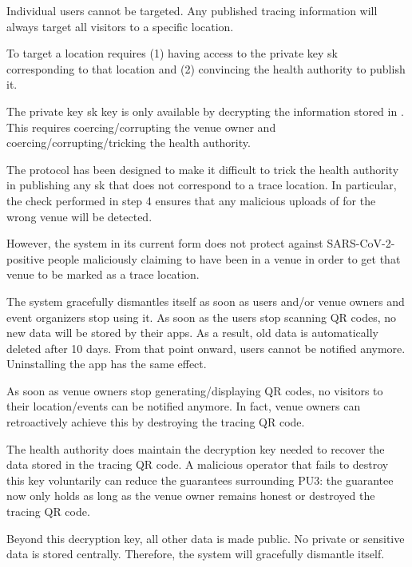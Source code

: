  Individual users cannot be targeted. Any published tracing information will always target all visitors to a specific location.

 To target a location requires (1) having access to the private key sk corresponding to that location and (2) convincing the health authority to publish it.

The private key sk key is only available by decrypting the information stored in \qrtrace. This requires coercing/corrupting the venue owner and coercing/corrupting/tricking the health authority.

The protocol has been designed to make it difficult to trick the health authority in publishing any sk that does not correspond to a trace location. In particular, the check performed in step 4 ensures that any malicious uploads of \qrtrace for the wrong venue will be detected.

However, the system in its current form does not protect against SARS-CoV-2-positive people maliciously claiming to have been in a venue in order to get that venue to be marked as a trace location.

 The system gracefully dismantles itself as soon as users and/or venue owners and event organizers stop using it. As soon as the users stop scanning QR codes, no new data will be stored by their apps. As a result, old data is automatically deleted after 10 days. From that point onward, users cannot be notified anymore. Uninstalling the app has the same effect.

As soon as venue owners stop generating/displaying QR codes, no visitors to their location/events can be notified anymore. In fact, venue owners can retroactively achieve this by destroying the tracing QR code.

The health authority does maintain the decryption key needed to recover the data stored in the tracing QR code. A malicious operator that fails to destroy this key voluntarily can reduce the guarantees surrounding PU3: the guarantee now only holds as long as the venue owner remains honest or destroyed the tracing QR code. 

Beyond this decryption key, all other data is made public. No private or sensitive data is stored centrally. Therefore, the system will gracefully dismantle itself.
